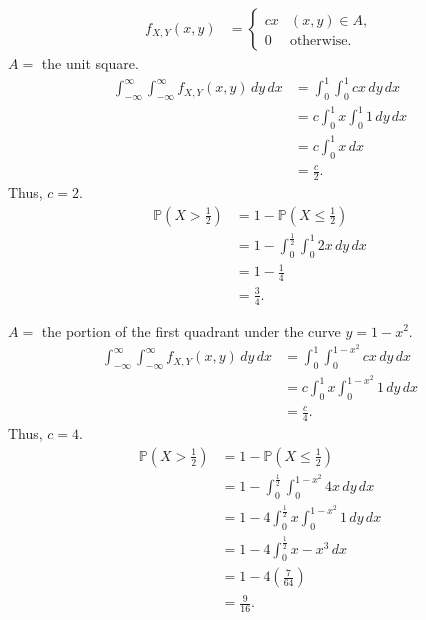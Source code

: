 \documentclass[12pt]{article}
\begin{document}
\newpage
{} \begin{align*} f_{X,Y}(x,y) &= \begin{cases} cx & (x,y) \in A, \\ 0 & \text{otherwise.} \end{cases}
\end{align*}
 $A =$ the unit square.
\begin{align*}
    \int_{-\infty}^\infty \int_{-\infty}^\infty f_{X,Y}(x,y)\,dy\,dx &= \int_0^1\int_0^1 cx\,dy\,dx \\
                                                                     &= c\int_0^1 x \int_0^1 1 \,dy\,dx \\
                                                                     &= c \int_0^1 x\,dx \\
                                                                     &= \frac c2.
\end{align*}
Thus, $c = 2$.
\begin{align*}
    \mathbb P\left(X > \frac12\right) &= 1 - \mathbb P\left(X \leq \frac12\right) \\
                       &= 1 - \int_0^\frac12 \int_0^1 2x \,dy\,dx \\
                       &= 1 - \frac14 \\
                       &= \frac34.
\end{align*}

\newpage
{} $A =$ the portion of the first quadrant under the curve $y=1-x^2$.
\begin{align*}
    \int_{-\infty}^\infty \int_{-\infty}^\infty f_{X,Y}(x,y)\,dy\,dx &= \int_0^1 \int_0^{1-x^2} cx\,dy\,dx \\
                                                                     &= c\int_0^1 x \int_0^{1-x^2} 1 \,dy\,dx \\
                                                                     &= \frac c4.
\end{align*}
Thus, $c = 4$.
\begin{align*}
    \mathbb P\left(X > \frac12\right) &= 1 - \mathbb P\left(X \leq \frac12\right) \\
                       &= 1 - \int_0^\frac12 \int_0^{1-x^2} 4x\,dy\,dx \\
                       &= 1 - 4\int_0^\frac12 x\int_0^{1-x^2} 1\,dy\,dx \\
                       &= 1 - 4\int_0^{\frac12} x - x^3\,dx \\
                       &= 1 - 4\left(\frac7{64}\right) \\
                       &= \frac9{16}.
\end{align*}
\end{document}
